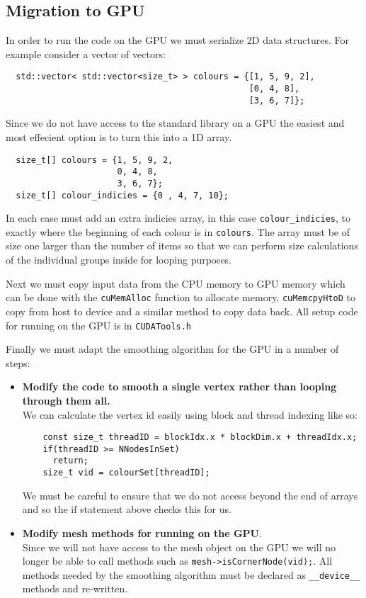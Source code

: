 \subsection*{Migration to GPU}
In order to run the code on the GPU we must serialize 2D data structures. For example consider a vector of vectors:
\begin{verbatim}
  std::vector< std::vector<size_t> > colours = {[1, 5, 9, 2],
                                                [0, 4, 8],
                                                [3, 6, 7]};
\end{verbatim}
Since we do not have access to the standard library on a GPU the easiest and most effecient option is to turn this into a 1D array.
\begin{verbatim}
  size_t[] colours = {1, 5, 9, 2,
                      0, 4, 8,
                      3, 6, 7};
  size_t[] colour_indicies = {0 , 4, 7, 10};
\end{verbatim}
In each case must add an extra indicies array, in this case \verb!colour_indicies!, to exactly where the beginning of each colour is in \verb!colours!. The array must be of size one larger than the number of items so that we can perform size
calculations of the individual groups inside for looping purposes.

Next we must copy input data from the CPU memory to GPU memory which can be done with the \verb!cuMemAlloc! function to allocate memory, \verb!cuMemcpyHtoD! to copy from host to device and a similar method to copy data back. All setup code for running on the GPU is in \verb!CUDATools.h!

Finally we must adapt the smoothing algorithm for the GPU in a number of steps:
\begin{itemize}
  \item \textbf{Modify the code to smooth a single vertex rather than looping through them all.} \\
        We can calculate the vertex id easily using block and thread indexing like so:
        \begin{verbatim}
    const size_t threadID = blockIdx.x * blockDim.x + threadIdx.x;
    if(threadID >= NNodesInSet)
      return;
    size_t vid = colourSet[threadID];
        \end{verbatim}
        We must be careful to ensure that we do not access beyond the end of arrays and so the if statement above checks this for us.
  \item \textbf{Modify mesh methods for running on the GPU}. \\
        Since we will not have access to the mesh object on the GPU we will no longer be able to call methods such as \verb!mesh->isCornerNode(vid);!. All methods needed by the smoothing algorithm must be declared as \verb!__device__! methods and re-written.
\end{itemize}

